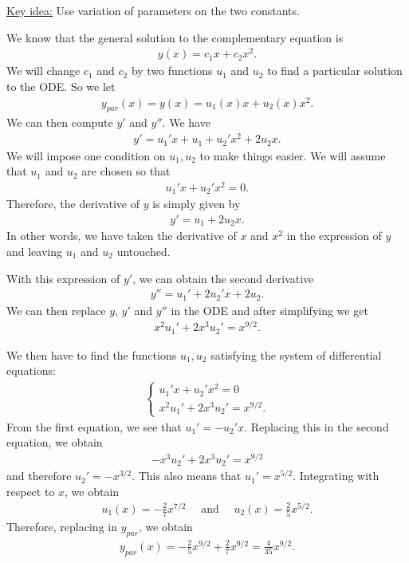 \documentclass[12pt,a4paper]{article}
\begin{document}
\begin{notes}
\noindent\underline{Key idea:} Use variation of parameters on the two constants.

We know that the general solution to the complementary equation is
	\begin{align*}
	y (x) = c_1 x + c_2 x^2 .
	\end{align*}
We will change $c_1$ and $c_2$ by two functions $u_1$ and $u_2$ to find a particular solution to the ODE. So we let 
	\begin{align*}
	y_{par} (x) = y(x) = u_1 (x) x + u_2 (x) x^2 .
	\end{align*}
We can then compute $y'$ and $y''$. We have
	\begin{align*}
	y' = u_1' x + u_1 + u_2' x^2 + 2u_2 x .
	\end{align*}
We will impose one condition on $u_1, u_2$ to make things easier. We will assume that $u_1$ and $u_2$ are chosen so that
	\begin{align}
	u_1'x + u_2' x^2 = 0 .
	\end{align}
Therefore, the derivative of $y$ is simply given by
	\begin{align*}
	y' = u_1 + 2u_2 x .
	\end{align*}
In other words, we have taken the derivative of $x$ and $x^2$ in the expression of $y$ and leaving $u_1$ and $u_2$ untouched. 

With this expression of $y'$, we can obtain the second derivative
	\begin{align*}
	y'' = u_1' + 2u_2' x + 2u_2 .
	\end{align*}
We can then replace $y$, $y'$ and $y''$ in the ODE and after simplifying we get
	\begin{align*}
	x^2 u_1' + 2x^3 u_2' = x^{9/2} .
	\end{align*}

We then have to find the functions $u_1, u_2$ satisfying the system of differential equations:
	\begin{align*}
	\left\{ \begin{matrix}
	u_1' x + u_2' x^2 = 0 \\
	x^2 u_1' + 2x^3 u_2' = x^{9/2} .
	\end{matrix} \right.
	\end{align*}
From the first equation, we see that $u_1' = -u_2'x$. Replacing this in the second equation, we obtain
	\begin{align*}
	-x^3 u_2' + 2x^3 u_2' = x^{9/2}
	\end{align*}
and therefore $u_2' = -x^{3/2}$. This also means that $u_1' = x^{5/2}$. Integrating with respect to $x$, we obtain
	\begin{align*}
	u_1 (x) = -\frac{2}{7} x^{7/2} \quad \text{ and } \quad u_2 (x) = \frac{2}{5} x^{5/2} .
	\end{align*}
Therefore, replacing in $y_{par}$, we obtain
	\begin{align*}
	y_{par} (x) = -\frac{2}{5} x^{9/2} + \frac{2}{7} x^{9/2} = \frac{4}{35} x^{9/2} .
	\end{align*}
	

\end{notes}
\end{document}
